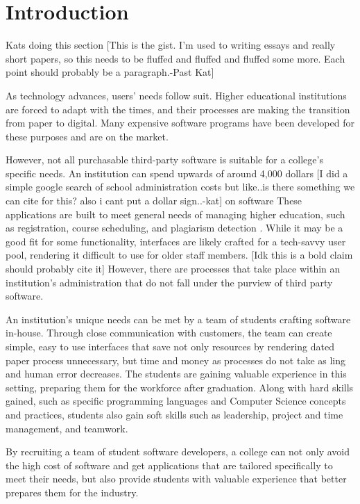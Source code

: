 \section{Introduction}
Kats doing this section
[This is the gist. I'm used to writing essays and really short papers, so this needs to be fluffed and fluffed and fluffed some more. Each point should probably be a paragraph.-Past Kat]

As technology advances, users' needs follow suit. Higher educational institutions are forced to adapt with the times, and their processes are making the transition from paper to digital. Many expensive software programs have been developed for these purposes and are on the market. 

However, not all purchasable third-party software is suitable for a college's specific needs. An institution can spend upwards of around 4,000 dollars [I did a simple google search of school administration costs but like..is there something we can cite for this? also i cant put a dollar sign..-kat] on software These applications are built to meet general needs of managing higher education, such as registration, course scheduling, and plagiarism detection \cite{plagarismsoftware}. While it may be a good fit for some functionality, interfaces are likely crafted for a tech-savvy user pool, rendering it difficult to use for older staff members. [Idk this is a bold claim should probably cite it] However, there are processes that take place within an institution's administration that do not fall under the purview of third party software.

An institution's unique needs can be met by a team of students crafting software in-house. Through close communication with customers, the team can create simple, easy to use interfaces that save not only resources by rendering dated paper process unnecessary, but time and money as processes do not take as ling and human error decreases. The students are gaining valuable experience in this setting, preparing them for the workforce after graduation. Along with hard skills gained, such as specific programming languages and Computer Science concepts and practices, students also gain soft skills \cite{softskills} such as leadership, project and time management, and teamwork.

By recruiting a team of student software developers, a college can not only avoid the high cost of software and get applications that are tailored specifically to meet their needs, but also provide students with valuable experience that better prepares them for the industry. 

